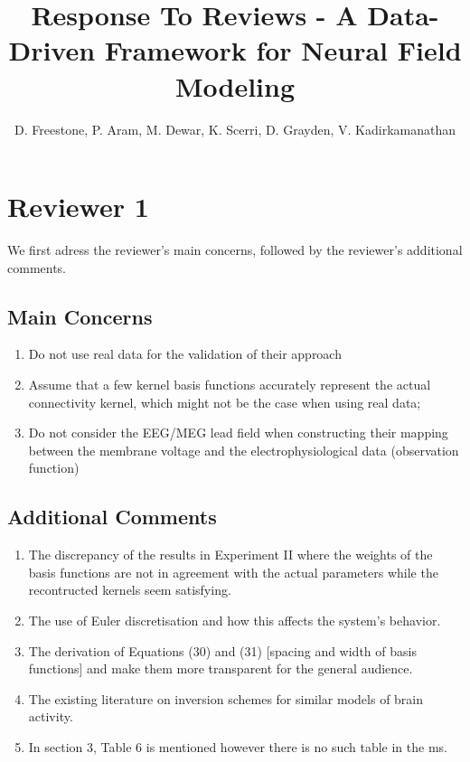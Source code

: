 \documentclass{article}
\title{Response To Reviews - A Data-Driven Framework for Neural Field Modeling}
\author{D. Freestone, P. Aram, M. Dewar, K. Scerri, D. Grayden, V. Kadirkamanathan}
\begin{document}
    \maketitle
    
    \section{Reviewer 1}
    
        We first adress the reviewer's main concerns, followed by the reviewer's additional comments.
        
    \subsection{Main Concerns}
    
    \begin{enumerate}
        \item Do not use real data for the validation of their approach
        \item Assume that a few kernel basis functions accurately represent the actual connectivity kernel, which might not be the case when using real data;
        \item Do not consider the EEG/MEG lead field when constructing their mapping between the membrane voltage and the electrophysiological data (observation function)
    \end{enumerate}
    
    \subsection{Additional Comments}
    
    \begin{enumerate}
        \item The discrepancy of the results in Experiment II where the weights of the basis functions are not in agreement with the actual parameters while the recontructed kernels seem satisfying.
        \item The use of Euler discretisation and how this affects the system's behavior.
        \item The derivation of Equations (30) and (31) [spacing and width of basis functions] and make them more transparent for the general audience.
        \item The existing literature on inversion schemes for similar models of brain activity.
        \item In section 3, Table 6 is mentioned however there is no such table in the ms.
    \end{enumerate}
    
\end{document}

